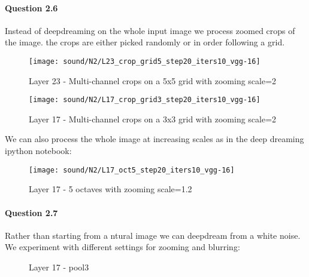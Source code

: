 \documentclass[10pt]{article}
\begin{document}
	\paragraph{Question 2.6} Instead of deepdreaming on the whole input image we process zoomed crops of the image. the crops are either picked randomly or in order following a grid.
	\begin{figure}[H]
    \centering
    \texttt{[image: sound/N2/L23\_crop\_grid5\_step20\_iters10\_vgg-16]}
    \caption{Layer 23 - Multi-channel crops on a 5x5 grid with zooming scale=2}
	\end{figure}
	\begin{figure}[H]
    \centering
    \texttt{[image: sound/N2/L17\_crop\_grid3\_step20\_iters10\_vgg-16]}
    \caption{Layer 17 - Multi-channel crops on a 3x3 grid with zooming scale=2}
	\end{figure}
	We can also process the whole image at increasing scales as in the deep dreaming ipython notebook:
	\begin{figure}[H]
	    \centering
	    \texttt{[image: sound/N2/L17\_oct5\_step20\_iters10\_vgg-16]}
	    \caption{Layer 17 - 5 octaves with zooming scale=1.2}
		\end{figure}
		\paragraph{Question 2.7} Rather than starting from a ntural image we can deepdream from a white noise. We experiment with different settings for zooming and blurring:
		\begin{figure}[H]
	    \centering
	    \vspace{5pt}
	    \vspace{5pt}
    \caption{Layer 17 - pool3}
	\end{figure}
 
\end{document}
